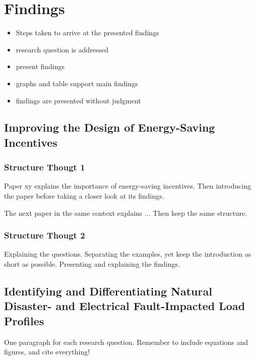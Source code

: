 \chapter{Findings}
\label{cha:findings}

\begin{itemize}
    \item Steps taken to arrive at the presented findings 
    \item research question is addressed
    \item present findings
    \item graphs and table support main findings 
    \item findings are presented without judgment
\end{itemize}

\section{Improving the Design of Energy-Saving Incentives}
\subsection*{Structure Thougt 1}
Paper xy explains the importance of energy-saving incentives.
Then introducing the paper before taking a closer look at its findings.

The next paper in the same context explains ...
Then keep the same structure.

\subsection*{Structure Thougt 2}
Explaining the questions.
Separating the examples, yet keep the introduction as short as possible.
Presenting and explaining the findings.

\section{Identifying and Differentiating Natural Disaster- and Electrical Fault-Impacted Load Profiles}

One paragraph for each research question.
Remember to include equations and figures, and cite everything!